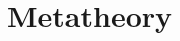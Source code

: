 \section{Metatheory}

{\javaassumptionsall}

{\istruefalsedefinitions}

{\consistentwithdefinition}

\begin{lemma}
  {\soundnesslemmahypothesis}
\end{lemma}
